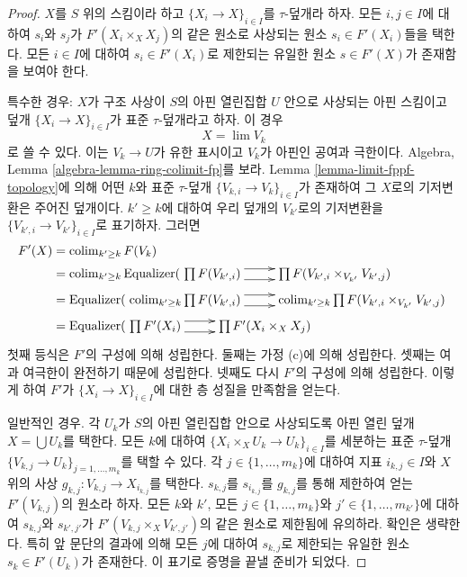 \begin{proof}
$X$를 $S$ 위의 스킴이라 하고 $\{X_i \to X\}_{i \in I}$를
$\tau$-덮개라 하자. 모든 $i, j \in I$에 대하여 $s_i$와 $s_j$가
$F'(X_i \times_X X_j)$의 같은 원소로 사상되는 원소
$s_i \in F'(X_i)$들을 택한다. 모든 $i \in I$에 대하여
$s_i \in F'(X_i)$로 제한되는 유일한 원소 $s \in F'(X)$가 존재함을
보여야 한다.

\medskip\noindent
특수한 경우: $X$가 구조 사상이 $S$의 아핀 열린집합 $U$ 안으로 사상되는
아핀 스킴이고 덮개 $\{X_i \to X\}_{i \in I}$가 표준 $\tau$-덮개라고
하자. 이 경우
$$
X = \lim V_k
$$
로 쓸 수 있다. 이는 $V_k \to U$가 유한 표시이고 $V_k$가 아핀인 공여과
극한이다. Algebra, Lemma \ref{algebra-lemma-ring-colimit-fp}를 보라. Lemma
\ref{lemma-limit-fppf-topology}에 의해 어떤 $k$와 표준 $\tau$-덮개
$\{V_{k, i} \to V_k\}_{i \in I}$가 존재하여 그 $X$로의 기저변환은 주어진
덮개이다. $k' \geq k$에 대하여 우리 덮개의 $V_{k'}$로의 기저변환을
$\{V_{k', i} \to V_{k'}\}_{i \in I}$로 표기하자. 그러면
\begin{align*}
F'(X)
& =
\colim_{k' \geq k} F(V_k) \\
& =
\colim_{k' \geq k}
\text{Equalizer}(
\xymatrix{
\prod F(V_{k', i})
\ar@<1ex>[r] \ar@<-1ex>[r] &
\prod F(V_{k', i} \times_{V_{k'}} V_{k', j})
}
\\
& =
\text{Equalizer}(
\xymatrix{
\colim_{k' \geq k}
\prod F(V_{k', i})
\ar@<1ex>[r] \ar@<-1ex>[r] &
\colim_{k' \geq k}
\prod F(V_{k', i} \times_{V_{k'}} V_{k', j})
}
\\
& =
\text{Equalizer}(
\xymatrix{
\prod F'(X_i)
\ar@<1ex>[r] \ar@<-1ex>[r] &
\prod F'(X_i \times_X X_j)
}
\end{align*}
첫째 등식은 $F'$의 구성에 의해 성립한다. 둘째는 가정 (c)에 의해 성립한다.
셋째는 여과 여극한이 완전하기 때문에 성립한다. 넷째도 다시 $F'$의 구성에
의해 성립한다. 이렇게 하여 $F'$가 $\{X_i \to X\}_{i \in I}$에 대한 층
성질을 만족함을 얻는다.

\medskip\noindent
일반적인 경우. 각 $U_k$가 $S$의 아핀 열린집합 안으로 사상되도록 아핀
열린 덮개 $X = \bigcup U_k$를 택한다. 모든 $k$에 대하여
$\{X_i \times_X U_k \to U_k\}_{i \in I}$를 세분하는 표준 $\tau$-덮개
$\{V_{k, j} \to U_k\}_{j = 1, \ldots, m_k}$를 택할 수 있다. 각
$j \in \{1, \ldots, m_k\}$에 대하여 지표 $i_{k, j} \in I$와 $X$ 위의
사상 $g_{k, j} : V_{k, j} \to X_{i_{k, j}}$를 택한다. $s_{k, j}$를
$s_{i_{k, j}}$를 $g_{k, j}$를 통해 제한하여 얻는 $F'(V_{k, j})$의 원소라
하자. 모든 $k$와 $k'$, 모든 $j \in \{1, \ldots, m_k\}$와
$j' \in \{1, \ldots, m_{k'}\}$에 대하여 $s_{k, j}$와 $s_{k', j'}$가
$F'(V_{k, j} \times_X V_{k', j'})$의 같은 원소로 제한됨에 유의하라.
확인은 생략한다. 특히 앞 문단의 결과에 의해 모든 $j$에 대하여
$s_{k, j}$로 제한되는 유일한 원소 $s_k \in F'(U_k)$가 존재한다. 이
표기로 증명을 끝낼 준비가 되었다.


\end{proof}
